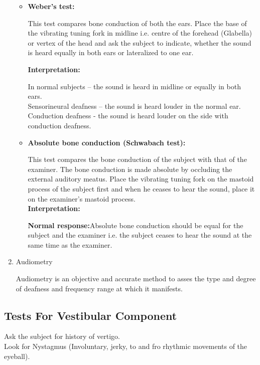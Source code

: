 \documentclass[a4paper,12pt,openany,twoside]{book}
\begin{document}
\begin{enumerate}
\begin{itemize}
{						}

					\item{\textbf{Weber’s test:}
\par
This test compares bone conduction of both the ears. 
Place the base of the vibrating tuning fork in midline i.e. centre of the forehead (Glabella) or vertex of the head and ask the subject to indicate, whether the sound is heard equally in both ears or lateralized to one ear.

						\textbf{Interpretation:}
						\par
In normal subjects – the sound is heard in midline or equally in both ears.\\
Sensorineural deafness – the sound is heard louder in the normal ear.\\
Conduction deafness - the sound is heard louder on the side with conduction deafness.
}
\item{\textbf{Absolute bone conduction (Schwabach test):}
	\par
	This test compares the bone conduction of the subject with that of the examiner.
	The bone conduction is made absolute by occluding the external auditory meatus. Place the vibrating tuning fork on the mastoid process of the subject first and when he ceases to hear the sound, place it on the examiner’s mastoid process.\\
						\textbf{Interpretation:}
						\par
						\textbf{Normal response:}Absolute bone conduction should be equal for the subject and the examiner i.e. the subject ceases to hear the sound at the same time as the examiner.
						}
				\end{itemize}

\item{Audiometry
	\par
	Audiometry is an objective and accurate method to asses the type and degree of deafness and frequency range at which it manifests.
	}

		\end{enumerate}

\subsection*{Tests For Vestibular Component}
Ask the subject for history of vertigo.\\
Look for Nystagmus (Involuntary, jerky, to and fro rhythmic movements of the eyeball).
\end{document}
